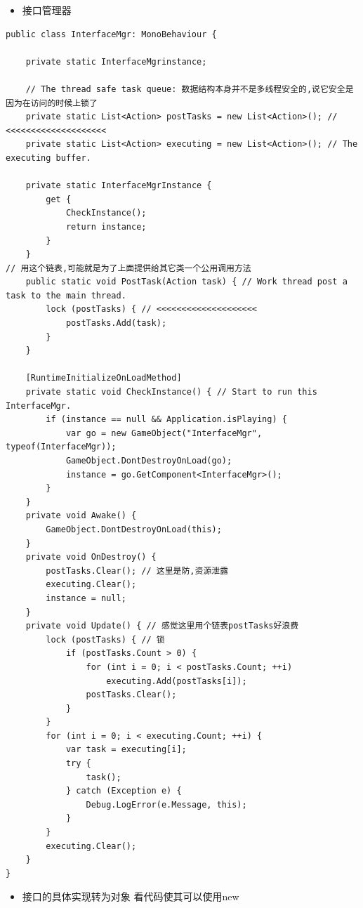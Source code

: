 \documentclass[9pt, b5paper]{article}
\begin{document}
\begin{itemize}
\item 接口管理器
\end{itemize}
\begin{verbatim}
public class InterfaceMgr: MonoBehaviour {

    private static InterfaceMgrinstance;

    // The thread safe task queue: 数据结构本身并不是多线程安全的,说它安全是因为在访问的时候上锁了
    private static List<Action> postTasks = new List<Action>(); // <<<<<<<<<<<<<<<<<<<< 
    private static List<Action> executing = new List<Action>(); // The executing buffer.

    private static InterfaceMgrInstance {
        get {
            CheckInstance();
            return instance;
        }
    }
// 用这个链表,可能就是为了上面提供给其它类一个公用调用方法
    public static void PostTask(Action task) { // Work thread post a task to the main thread.
        lock (postTasks) { // <<<<<<<<<<<<<<<<<<<< 
            postTasks.Add(task);
        }
    }
    
    [RuntimeInitializeOnLoadMethod]
    private static void CheckInstance() { // Start to run this InterfaceMgr.
        if (instance == null && Application.isPlaying) {
            var go = new GameObject("InterfaceMgr", typeof(InterfaceMgr));
            GameObject.DontDestroyOnLoad(go);
            instance = go.GetComponent<InterfaceMgr>();
        }
    }
    private void Awake() {
        GameObject.DontDestroyOnLoad(this);
    }
    private void OnDestroy() {
        postTasks.Clear(); // 这里是防,资源泄露
        executing.Clear();
        instance = null;
    }
    private void Update() { // 感觉这里用个链表postTasks好浪费
        lock (postTasks) { // 锁
            if (postTasks.Count > 0) {
                for (int i = 0; i < postTasks.Count; ++i) 
                    executing.Add(postTasks[i]);
                postTasks.Clear();
            }
        }
        for (int i = 0; i < executing.Count; ++i) {
            var task = executing[i];
            try {
                task();
            } catch (Exception e) {
                Debug.LogError(e.Message, this);
            }
        }
        executing.Clear();
    }
}
\end{verbatim}
\begin{itemize}
\item 接口的具体实现转为对象 看代码使其可以使用new
\end{itemize}
\end{document}
